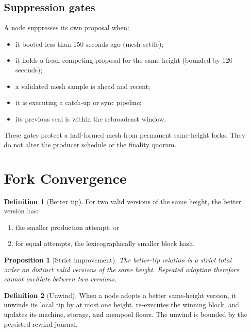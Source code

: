 \documentclass[11pt,a4paper]{article}
\theoremstyle{definition}
\newtheorem{definition}{Definition}[section]
\theoremstyle{plain}
\newtheorem{proposition}{Proposition}[section]
\begin{document}
\subsection{Suppression gates}

A node suppresses its own proposal when:
\begin{itemize}[leftmargin=*]
  \item it booted less than 150 seconds ago (mesh settle);
  \item it holds a fresh competing proposal for the same height (bounded by
        120 seconds);
  \item a validated mesh sample is ahead and recent;
  \item it is executing a catch-up or sync pipeline;
  \item its previous seal is within the rebroadcast window.
\end{itemize}
These gates protect a half-formed mesh from permanent same-height forks. They
do not alter the producer schedule or the finality quorum.

\section{Fork Convergence}

\begin{definition}[Better tip]
For two valid versions of the same height, the better version has:
\begin{enumerate}[leftmargin=*]
  \item the smaller production attempt; or
  \item for equal attempts, the lexicographically smaller block hash.
\end{enumerate}
\end{definition}

\begin{proposition}[Strict improvement]
The better-tip relation is a strict total order on distinct valid versions of
the same height. Repeated adoption therefore cannot oscillate between two
versions.
\end{proposition}

\begin{definition}[Unwind]
When a node adopts a better same-height version, it unwinds its local tip by
at most one height, re-executes the winning block, and updates its machine,
storage, and mempool floors. The unwind is bounded by the persisted rewind
journal.
\end{definition}
\end{document}
